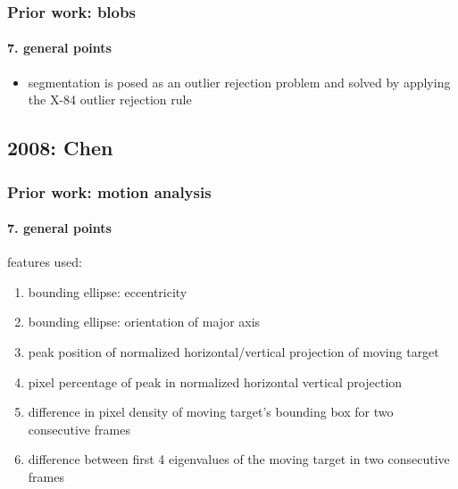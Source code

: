 \begin{frame}
\frametitle{Prior work: blobs}
\framesubtitle{7. general points}
\mypagenum
{}
	\begin{itemize}
		\item segmentation is posed as an outlier rejection problem and solved by applying the X-84 outlier rejection rule
	\end{itemize}
\end{frame}



\subsection{2008: Chen}
\begin{frame}
\frametitle{Prior work: motion analysis}
\framesubtitle{7. general points}
\mypagenum
{}	
	features used:
	\begin{enumerate}
		\item bounding ellipse: eccentricity
		\item bounding ellipse: orientation of major axis
		\item peak position of normalized horizontal/vertical projection of moving target
		\item pixel percentage of peak in normalized horizontal vertical projection
		\item difference in pixel density of moving target's bounding box for two consecutive frames
		\item difference between first 4 eigenvalues of the moving target in two consecutive frames
	\end{enumerate}
\end{frame}



\printbibliography

